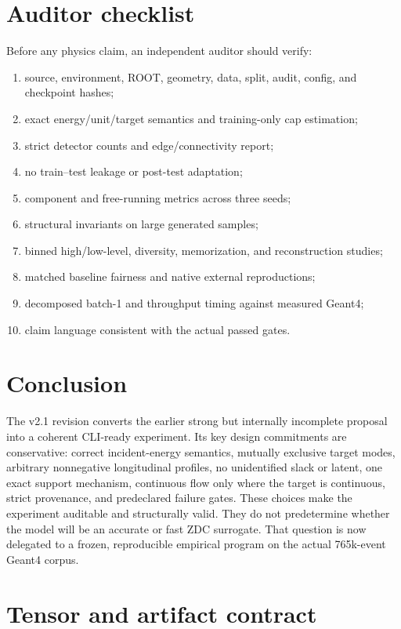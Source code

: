 \documentclass[10pt,a4paper]{article}
\begin{document}
\section{Auditor checklist}

Before any physics claim, an independent auditor should verify:
\begin{enumerate}
\item source, environment, ROOT, geometry, data, split, audit, config, and checkpoint hashes;
\item exact energy/unit/target semantics and training-only cap estimation;
\item strict detector counts and edge/connectivity report;
\item no train--test leakage or post-test adaptation;
\item component and free-running metrics across three seeds;
\item structural invariants on large generated samples;
\item binned high/low-level, diversity, memorization, and reconstruction studies;
\item matched baseline fairness and native external reproductions;
\item decomposed batch-1 and throughput timing against measured Geant4;
\item claim language consistent with the actual passed gates.
\end{enumerate}

\section{Conclusion}

The v2.1 revision converts the earlier strong but internally incomplete proposal into a coherent CLI-ready experiment. Its key design commitments are conservative: correct incident-energy semantics, mutually exclusive target modes, arbitrary nonnegative longitudinal profiles, no unidentified slack or latent, one exact support mechanism, continuous flow only where the target is continuous, strict provenance, and predeclared failure gates. These choices make the experiment auditable and structurally valid. They do not predetermine whether the model will be an accurate or fast ZDC surrogate. That question is now delegated to a frozen, reproducible empirical program on the actual 765k-event Geant4 corpus.


\appendix
\section{Tensor and artifact contract}
\end{document}
